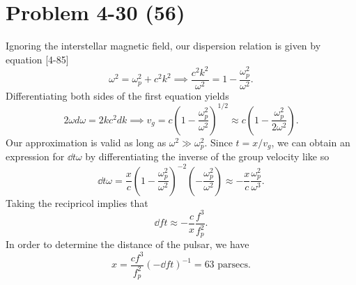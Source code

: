 \section*{Problem 4-30 (56)}
\label{sec:4-30}
Ignoring the interstellar magnetic field, our dispersion relation is given by equation [4-85]
\begin{equation*}
	\omega^2 = \omega_p^2 + c^2k^2 \implies \dfrac{c^2k^2}{\omega^2} = 1 - \dfrac{\omega_p^2}{\omega^2}.
\end{equation*}
Differentiating both sides of the first equation yields
\begin{equation*}
	2\omega d\omega = 2kc^2dk \implies v_g = c\left(1 - \dfrac{\omega_p^2}{\omega^2}\right)^{1/2} \approx c\left(1 - \dfrac{\omega_p^2}{2\omega^2}\right).
\end{equation*}
Our approximation is valid as long as \(\omega^2 \gg \omega_p^2 \). Since \(t = x/v_g \), we can obtain an expression for \(\dd{t}{\omega} \) by differentiating the inverse of the group velocity like so
\begin{equation*}
	\dd{t}{\omega} = \dfrac{x}{c}\left(1 - \dfrac{\omega_p^2}{\omega^2}\right)^{-2}\left(-\dfrac{\omega_p^2}{\omega^2} \right) \approx -\dfrac{x}{c}\dfrac{\omega_p^2}{\omega^3}.
\end{equation*}
Taking the recipricol implies that 
\begin{equation*}
	\dd{f}{t} \approx -\dfrac{c}{x}\dfrac{f^3}{f^2_p}.
\end{equation*}
In order to determine the distance of the pulsar, we have
\begin{equation*}
	x = \dfrac{cf^3}{f^2_p}\left(-\dd{f}{t} \right)^{-1} = 63\text{ parsecs}.
\end{equation*}



